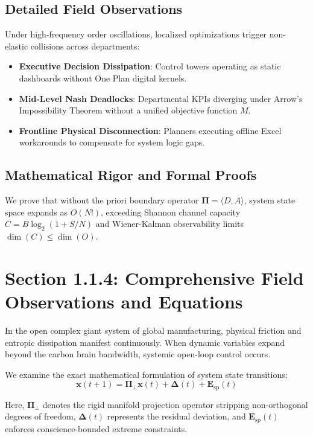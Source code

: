 \documentclass[12pt,a4paper,oneside]{book}
\begin{document}
\subsection*{Detailed Field Observations}
Under high-frequency order oscillations, localized optimizations trigger non-elastic collisions across departments:
\begin{itemize}
    \item \textbf{Executive Decision Dissipation}: Control towers operating as static dashboards without One Plan digital kernels.
    \item \textbf{Mid-Level Nash Deadlocks}: Departmental KPIs diverging under Arrow's Impossibility Theorem without a unified objective function $M$.
    \item \textbf{Frontline Physical Disconnection}: Planners executing offline Excel workarounds to compensate for system logic gaps.
\end{itemize}

\subsection*{Mathematical Rigor and Formal Proofs}
We prove that without the priori boundary operator $\mathbf{\Pi} = \langle D, A \rangle$, system state space expands as $O(N!)$, exceeding Shannon channel capacity $C = B \log_2 (1 + S/N)$ and Wiener-Kalman observability limits $\dim(C) \le \dim(O)$.
\clearpage
\section{Section 1.1.4: Comprehensive Field Observations and Equations}

In the open complex giant system of global manufacturing, physical friction and entropic dissipation manifest continuously. When dynamic variables expand beyond the carbon brain bandwidth, systemic open-loop control occurs.

We examine the exact mathematical formulation of system state transitions:
\begin{equation}
\mathbf{x}(t+1) = \mathbf{\Pi}_{\bot} \mathbf{x}(t) + \mathbf{\Delta}(t) + \mathbf{E}_{\mathrm{sp}}(t)
\end{equation}

Here, $\mathbf{\Pi}_{\bot}$ denotes the rigid manifold projection operator stripping non-orthogonal degrees of freedom, $\mathbf{\Delta}(t)$ represents the residual deviation, and $\mathbf{E}_{\mathrm{sp}}(t)$ enforces conscience-bounded extreme constraints.
\end{document}
